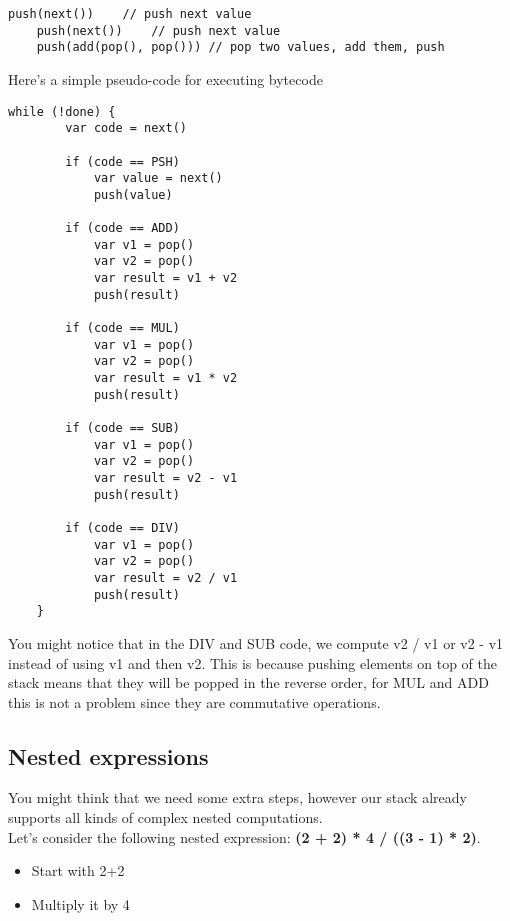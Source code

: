 \documentclass[../documentation.tex]{subfiles}
\begin{document}
\begin{lstlisting}[style=generic]
    push(next())    // push next value
    push(next())    // push next value
    push(add(pop(), pop())) // pop two values, add them, push
\end{lstlisting}

Here's a simple pseudo-code for executing bytecode

\begin{lstlisting}[style=generic]
    while (!done) {
        var code = next()
    
        if (code == PSH)
            var value = next()
            push(value)
    
        if (code == ADD)
            var v1 = pop()
            var v2 = pop()
            var result = v1 + v2
            push(result)
    
        if (code == MUL)
            var v1 = pop()
            var v2 = pop()
            var result = v1 * v2
            push(result)
    
        if (code == SUB)
            var v1 = pop()
            var v2 = pop()
            var result = v2 - v1
            push(result)
    
        if (code == DIV)
            var v1 = pop()
            var v2 = pop()
            var result = v2 / v1
            push(result)
    }
\end{lstlisting}

You might notice that in the DIV and SUB code, we compute v2 / v1 or v2 - v1 instead of using v1 and then v2.
This is because pushing elements on top of the stack means that they will be popped in the reverse order, for MUL and ADD
this is not a problem since they are commutative operations.

\pagebreak

\subsection{Nested expressions}

You might think that we need some extra steps, however our stack already supports all kinds of complex nested computations.
\\
Let's consider the following nested expression: \textbf{(2 + 2) * 4 / ((3 - 1) * 2)}.

\begin{itemize}
    \item Start with 2+2
    \item Multiply it by 4
\end{itemize}
\end{document}
